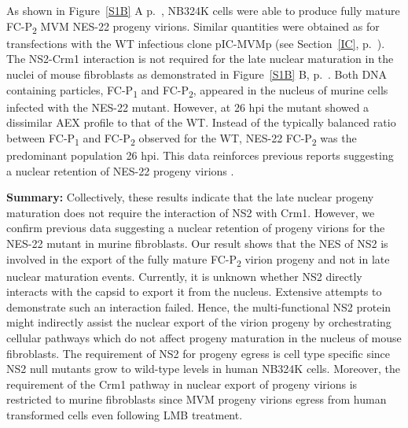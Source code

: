 As shown in Figure~\ref{S1B} A p.~\pageref{S1B}, NB324K cells were able to produce fully mature FC-P\textsubscript{2} MVM NES-22 \cite{pmid12239307} progeny virions. Similar quantities were obtained as for transfections with the WT infectious clone pIC-MVMp (see Section~\ref{IC}, p.~\pageref{IC}). The NS2-Crm1 interaction is not required for the late nuclear maturation in the nuclei of mouse fibroblasts as demonstrated in Figure~\ref{S1B} B, p.~\pageref{S1B}. Both DNA containing particles, FC-P\textsubscript{1} and FC-P\textsubscript{2}, appeared in the nucleus of murine cells infected with the NES-22 mutant. However, at 26 hpi the mutant showed a dissimilar AEX profile to that of the WT. Instead of the typically balanced ratio between FC-P\textsubscript{1} and FC-P\textsubscript{2} observed for the WT, NES-22 FC-P\textsubscript{2} was the predominant population 26 hpi. This data reinforces previous reports suggesting a nuclear retention of NES-22 progeny virions \cite{pmid12239307, pmid11884550}.     

             

\textbf{Summary:} Collectively, these results indicate that the late nuclear progeny maturation does not require the interaction of NS2 with Crm1. However, we confirm previous data suggesting a nuclear retention of progeny virions for the NES-22 mutant in murine fibroblasts. Our result shows that the NES of NS2 is involved in the export of the fully mature FC-P\textsubscript{2} virion progeny and not in late nuclear maturation events. Currently, it is unknown whether NS2 directly interacts with the capsid to export it from the nucleus. Extensive attempts to demonstrate such an interaction failed. Hence, the multi-functional NS2 protein might indirectly assist the nuclear export of the virion progeny by orchestrating cellular pathways which do not affect progeny maturation in the nucleus of mouse fibroblasts. The requirement of NS2 for progeny egress is cell type specific since NS2 null mutants grow to wild-type levels in human NB324K cells. Moreover, the requirement of the Crm1 pathway in nuclear export of progeny virions is restricted to murine fibroblasts since MVM progeny virions egress from human transformed cells even following LMB treatment.  



